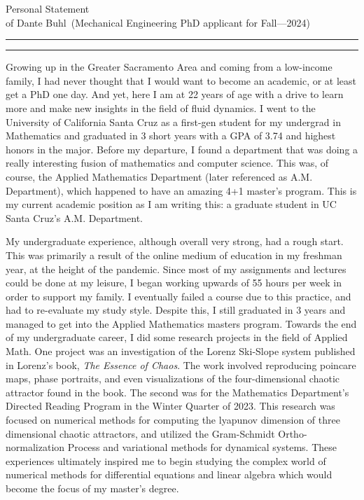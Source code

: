 \documentclass{article}
\newcommand{\soptitle}{Personal Statement}
\newcommand{\yourname}{Dante Buhl}
\begin{document}
\begin{center}\LARGE\soptitle\\
\large of \yourname\ (Mechanical Engineering PhD applicant for Fall---2024)
\end{center}

\hrule
\vspace{1pt}
\hrule height 1pt

\bigskip

\large
Growing up in the Greater Sacramento Area and coming from a low-income family, I had never thought that I would want to become an academic, or at least get a PhD one day. And yet, here I am at 22 years of age with a drive to learn more and make new insights in the field of fluid dynamics. I went to the University of California Santa Cruz as a first-gen student for my undergrad in Mathematics and graduated in 3 short years with a GPA of 3.74 and highest honors in the major. Before my departure, I found a department that was doing a really interesting fusion of mathematics and computer science. This was, of course, the Applied Mathematics Department (later referenced as A.M. Department), which happened to have an amazing 4+1 master's program. This is my current academic position as I am writing this: a graduate student in UC Santa Cruz's A.M. Department. 

My undergraduate experience, although overall very strong, had a rough start. This was primarily a result of the online medium of education in my freshman year, at the height of the pandemic. Since most of my assignments and lectures could be done at my leisure, I began working upwards of 55 hours per week in order to support my family. I eventually failed a course due to this practice, and had to re-evaluate my study style. Despite this, I still graduated in 3 years and managed to get into the Applied Mathematics masters program. Towards the end of my undergraduate career, I did some research projects in the field of Applied Math. One project was an investigation of the Lorenz Ski-Slope system published in Lorenz's book, \textit{The Essence of Chaos}. The work involved reproducing poincare maps, phase portraits, and even visualizations of the four-dimensional chaotic attractor found in the book. The second was for the Mathematics Department's Directed Reading Program in the Winter Quarter of 2023. This research was focused on numerical methods for computing the lyapunov dimension of three dimensional chaotic attractors, and utilized the Gram-Schmidt Ortho-normalization Process and variational methods for dynamical systems. These experiences ultimately inspired me to begin studying the complex world of numerical methods for differential equations and linear algebra which would become the focus of my master's degree. 
\end{document}
